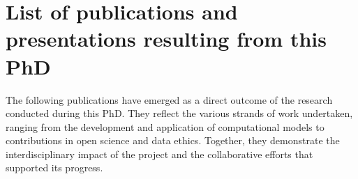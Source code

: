 \documentclass[
  11pt,
  letterpaper,
]{scrreprt}
\begin{document}

\chapter*{List of publications and presentations resulting from this
PhD}\label{list-of-publications-and-presentations-resulting-from-this-phd}


The following publications have emerged as a direct outcome of the
research conducted during this PhD. They reflect the various strands of
work undertaken, ranging from the development and application of
computational models to contributions in open science and data ethics.
Together, they demonstrate the interdisciplinary impact of the project
and the collaborative efforts that supported its progress.
\end{document}
